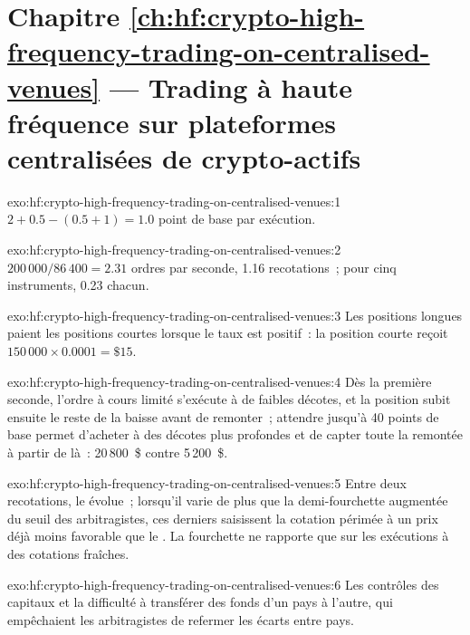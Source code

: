 \section*{Chapitre \ref{ch:hf:crypto-high-frequency-trading-on-centralised-venues} --- Trading à haute fréquence sur plateformes centralisées de crypto-actifs}

\begin{solution}{exo:hf:crypto-high-frequency-trading-on-centralised-venues:1}
$2+0.5-(0.5+1)=1.0$ point de base par exécution.
\end{solution}

\begin{solution}{exo:hf:crypto-high-frequency-trading-on-centralised-venues:2}
$200\,000/86\,400=2.31$ ordres par seconde, 1.16 recotations~; pour cinq instruments, 0.23 chacun.
\end{solution}

\begin{solution}{exo:hf:crypto-high-frequency-trading-on-centralised-venues:3}
Les positions longues paient les positions courtes lorsque le taux est positif~: la position courte reçoit $150\,000\times0.0001=\$15$.
\end{solution}

\begin{solution}{exo:hf:crypto-high-frequency-trading-on-centralised-venues:4}
Dès la première seconde, l'ordre à cours limité s'exécute à de faibles décotes, et la position subit ensuite le reste de la baisse avant de remonter~; attendre jusqu'à 40
points de base permet d'acheter à des décotes plus profondes et de capter toute la remontée à partir de là~: 20\,800~\$ contre 5\,200~\$.
\end{solution}

\begin{solution}{exo:hf:crypto-high-frequency-trading-on-centralised-venues:5}
Entre deux recotations, le  évolue~; lorsqu'il varie de plus que la demi-fourchette augmentée du seuil des arbitragistes, ces derniers saisissent la cotation périmée à un
prix déjà moins favorable que le . La fourchette ne rapporte que sur les exécutions à des cotations fraîches.
\end{solution}

\begin{solution}{exo:hf:crypto-high-frequency-trading-on-centralised-venues:6}
Les contrôles des capitaux et la difficulté à transférer des fonds d'un pays à l'autre, qui empêchaient les arbitragistes de refermer les écarts entre pays.
\end{solution}

